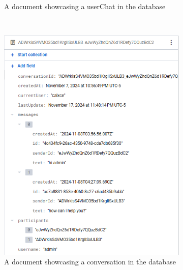 \begin{figure}[b]
\begin{subfigure}[b]{0.45\textwidth}
        \caption{A document showcasing a userChat in the database}
        \label{fig:userChatDB}
    \end{subfigure}
    \\[1em]
    \begin{subfigure}[b]{0.45\textwidth}
        \centering
        \includegraphics[width=\textwidth]{figures/DB Screenshot conversations.png}
        \caption{A document showcasing a conversation in the database}
        \label{fig:conversationDB}
    \end{subfigure}
    \hfill
    \begin{subfigure}[b]{0.45\textwidth}
        \centering

\end{subfigure}
\end{figure}
